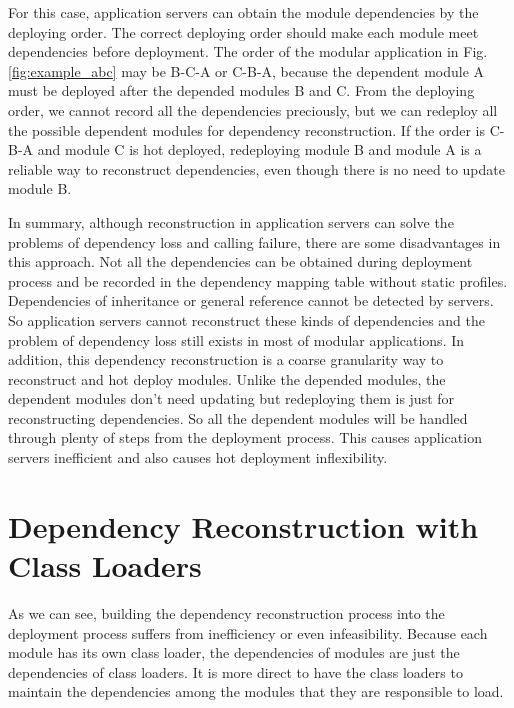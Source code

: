 \documentclass[conference]{IEEEtran}
\begin{document}
For this case, application servers can obtain the module dependencies by the deploying order. The correct deploying order should make each module meet dependencies before deployment. The order of the modular application in Fig. \ref{fig:example_abc} may be B-C-A or C-B-A, because the dependent module A must be deployed after the depended modules B and C. From the deploying order, we cannot record all the dependencies preciously, but we can redeploy all the possible dependent modules for dependency reconstruction. If the order is C-B-A and module C is hot deployed, redeploying module B and module A is a reliable way to reconstruct dependencies, even though there is no need to update module B.

In summary, although reconstruction in application servers can solve the problems of dependency loss and calling failure, there are some disadvantages in this approach.
Not all the dependencies can be obtained during deployment process and be recorded in the dependency mapping table without static profiles.
Dependencies of inheritance or general reference cannot be detected by servers.
So application servers cannot reconstruct these kinds of dependencies and the problem of dependency loss still exists in most of modular applications.
In addition, this dependency reconstruction is a coarse granularity way to reconstruct and hot deploy modules.
Unlike the depended modules, the dependent modules don't need updating but redeploying them is just for reconstructing dependencies.
So all the dependent modules will be handled through plenty of steps from the deployment process.
This causes application servers inefficient and also causes hot deployment inflexibility.


 
 
\section{Dependency Reconstruction with Class Loaders\label{sec:reconstructionCL}}

As we can see, building the dependency reconstruction process into the deployment process suffers from inefficiency or even infeasibility. 
Because each module has its own class loader, the dependencies of modules are just the dependencies of class loaders. 
It is more direct to have the class loaders to maintain the dependencies among the modules that they are responsible to load. 
\end{document}
